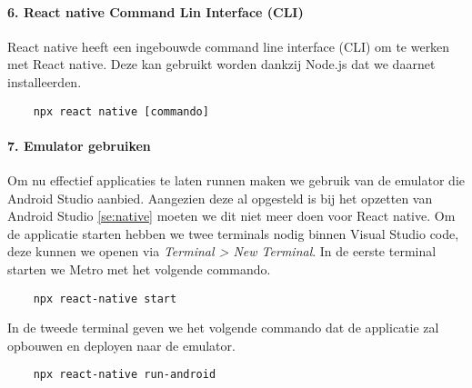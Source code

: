 \paragraph{6. React native Command Lin Interface (CLI)}
React native heeft een ingebouwde command line interface (CLI) om te werken met React native. 
Deze kan gebruikt worden dankzij Node.js dat we daarnet installeerden.
\begin{verbatim}
    npx react native [commando]
\end{verbatim}

\paragraph{7. Emulator gebruiken}
Om nu effectief applicaties te laten runnen maken we gebruik van de emulator die Android Studio aanbied. 
Aangezien deze al opgesteld is bij het opzetten van Android Studio \ref{se:native} 
moeten we dit niet meer doen voor React native. Om de applicatie starten hebben we twee terminals nodig 
binnen Visual Studio code, deze kunnen we openen via \textit{Terminal > New Terminal}. 
In de eerste terminal starten we \gls{Metro} met het volgende commando.
\begin{verbatim}
    npx react-native start
\end{verbatim}
In de tweede terminal geven we het volgende commando dat de applicatie zal opbouwen en 
deployen naar de emulator.
\begin{verbatim}
    npx react-native run-android
\end{verbatim}

